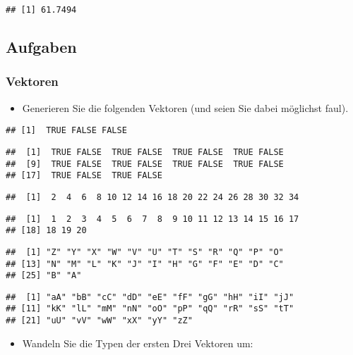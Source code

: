 \documentclass[11pt,german,a4paper]{article}
\providecommand{\tightlist}{%
  \setlength{\itemsep}{0pt}\setlength{\parskip}{0pt}}
\begin{document}
\begin{verbatim}
## [1] 61.7494
\end{verbatim}

\hypertarget{aufgaben-1}{%
\subsection{Aufgaben}\label{aufgaben-1}}

\hypertarget{vektoren-1}{%
\subsubsection{Vektoren}\label{vektoren-1}}

\begin{itemize}
\tightlist
\item
  Generieren Sie die folgenden Vektoren (und seien Sie dabei möglichst faul).
\end{itemize}

\begin{verbatim}
## [1]  TRUE FALSE FALSE
\end{verbatim}

\begin{verbatim}
##  [1]  TRUE FALSE  TRUE FALSE  TRUE FALSE  TRUE FALSE
##  [9]  TRUE FALSE  TRUE FALSE  TRUE FALSE  TRUE FALSE
## [17]  TRUE FALSE  TRUE FALSE
\end{verbatim}

\begin{verbatim}
##  [1]  2  4  6  8 10 12 14 16 18 20 22 24 26 28 30 32 34
\end{verbatim}

\begin{verbatim}
##  [1]  1  2  3  4  5  6  7  8  9 10 11 12 13 14 15 16 17
## [18] 18 19 20
\end{verbatim}

\begin{verbatim}
##  [1] "Z" "Y" "X" "W" "V" "U" "T" "S" "R" "Q" "P" "O"
## [13] "N" "M" "L" "K" "J" "I" "H" "G" "F" "E" "D" "C"
## [25] "B" "A"
\end{verbatim}

\begin{verbatim}
##  [1] "aA" "bB" "cC" "dD" "eE" "fF" "gG" "hH" "iI" "jJ"
## [11] "kK" "lL" "mM" "nN" "oO" "pP" "qQ" "rR" "sS" "tT"
## [21] "uU" "vV" "wW" "xX" "yY" "zZ"
\end{verbatim}

\begin{itemize}
\tightlist
\item
  Wandeln Sie die Typen der ersten Drei Vektoren um:
\end{itemize}
\end{document}

